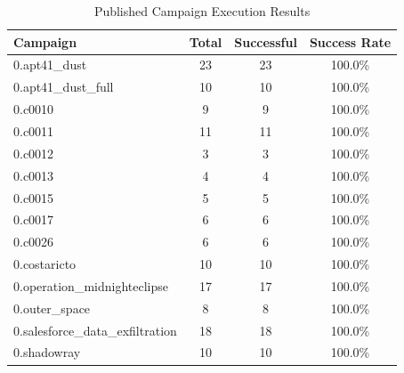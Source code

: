 \begin{table}[htbp]
\centering
\caption{Published Campaign Execution Results}
\label{tab:execution}
\begin{tabular}{lccc}
\toprule
Campaign & Total & Successful & Success Rate \\
\midrule
0.apt41_dust & 23 & 23 & 100.0\% \\
0.apt41_dust_full & 10 & 10 & 100.0\% \\
0.c0010 & 9 & 9 & 100.0\% \\
0.c0011 & 11 & 11 & 100.0\% \\
0.c0012 & 3 & 3 & 100.0\% \\
0.c0013 & 4 & 4 & 100.0\% \\
0.c0015 & 5 & 5 & 100.0\% \\
0.c0017 & 6 & 6 & 100.0\% \\
0.c0026 & 6 & 6 & 100.0\% \\
0.costaricto & 10 & 10 & 100.0\% \\
0.operation_midnighteclipse & 17 & 17 & 100.0\% \\
0.outer_space & 8 & 8 & 100.0\% \\
0.salesforce_data_exfiltration & 18 & 18 & 100.0\% \\
0.shadowray & 10 & 10 & 100.0\% \\
\bottomrule
\end{tabular}
\end{table}

